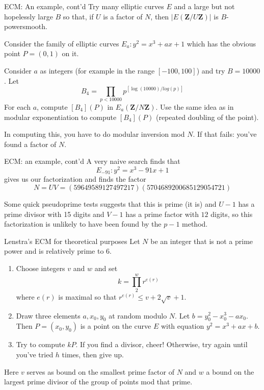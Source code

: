 \documentclass{beamer}
\begin{document}
\begin{frame}{ECM: An example, cont'd}
Try many elliptic curves $E$ and a large but not hopelessly large $B$ so that, if $U$ is a factor of $N$, then
$|E(\mathbf{Z}/U\mathbf{Z})|$ is $B$-powersmooth.

\bigskip\noindent
Consider the family of elliptic curves $E_{a}:y^2=x^3+ax+1$ which has the obvious point $P=(0,1)$ on it.  

\bigskip\noindent
Consider $a$ as integers (for example in the range $[-100,100]$) and try $B=10000$.  Let
$$
B_{4}=\prod_{p<10000} p^{[\log (10000)/log(p)]}
$$
For each $a$, compute
$[B_4](P)$ in $E_{a}(\mathbf{Z}/N\mathbf{Z})$.  Use the same idea as in modular exponentiation to compute $[B_4](P)$ (repeated doubling of the point).  

\bigskip
In computing this, you have to do modular inversion mod $N$.  If that fails: you've found a factor of $N$.
\end{frame}
\begin{frame}{ECM: an example, cont'd}
A very naive search finds that 
$$
E_{-91}: y^2=x^3-91x+1
$$  
gives us our factorization and finds the factor 
$$N=UV=(59649589127497217)(5704689200685129054721)$$

\bigskip\noindent
Some quick pseudoprime tests suggests that this is prime (it is) and $U-1$ has a prime divisor with 15 digits and $V-1$
has a prime factor with $12$ digits,  so this factorization is unlikely to have been found by the $p-1$ method.
\end{frame}
\begin{frame}{Lenstra's ECM for theoretical purposes}
Let $N$ be an integer that is not a prime power and is relatively prime to
$6$. 
\begin{enumerate} 

\item Choose integers $v$ and $w$ and set
$$
k=\prod_{2}^{w} r^{e(r)}
$$
where $e(r)$ is maximal so that 
$r^{e(r)}\le v+2\sqrt{v}+1.
$
\item Draw three elements $a,x_0,y_0$ at random modulo $N$.  Let $b=y_0^2-x_0^3-ax_0$.  Then $P=(x_0,y_0)$ is a point on the curve
$E$ with equation $y^2=x^3+ax+b$.  
\item Try to compute $kP$.  If you find a divisor, cheer! Otherwise, try again until you've tried $h$ times, then give up.
\end{enumerate}
Here $v$ serves as bound on the smallest prime factor of $N$ and $w$ a bound on the largest prime divisor of the group of points mod that prime. 
\end{frame}
\end{document}
